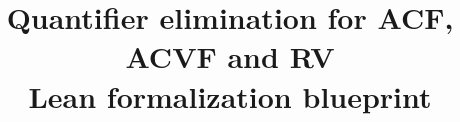 \theoremstyle{definition}
\newtheorem{theorem}{Theorem}
\newtheorem{definition}[theorem]{Definition}
\newtheorem{lemma}[theorem]{Lemma}
\newtheorem{proposition}[theorem]{Proposition}
\newtheorem{corollary}[theorem]{Corollary}
\newtheorem{remark}[theorem]{Remark}
\newtheorem{assumption}[theorem]{External hypothesis}
\newtheorem{checkedimport}[theorem]{Checked Lean import}
\newcommand{\rv}{\operatorname{rv}}
\newcommand{\repoFile}[2]{\href{https://github.com/daviddhilbert/ACVF-QE/blob/939346b0a99899e22a873479364e3cc5d142731c/#1}{#2}}
\title{Quantifier elimination for ACF, ACVF and RV\\\large Lean formalization blueprint}
\author{}
\date{}
